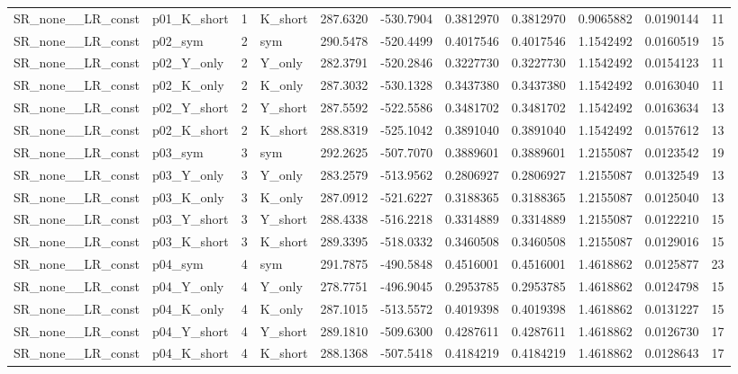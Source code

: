 \begin{table}[!h]
\begin{tabular}[t]{llrlrrrrrrr}
SR\_none\_\_LR\_const & p01\_K\_short & 1 & K\_short & 287.6320 & -530.7904 & 0.3812970 & 0.3812970 & 0.9065882 & 0.0190144 & 11\\
\addlinespace
SR\_none\_\_LR\_const & p02\_sym & 2 & sym & 290.5478 & -520.4499 & 0.4017546 & 0.4017546 & 1.1542492 & 0.0160519 & 15\\
SR\_none\_\_LR\_const & p02\_Y\_only & 2 & Y\_only & 282.3791 & -520.2846 & 0.3227730 & 0.3227730 & 1.1542492 & 0.0154123 & 11\\
SR\_none\_\_LR\_const & p02\_K\_only & 2 & K\_only & 287.3032 & -530.1328 & 0.3437380 & 0.3437380 & 1.1542492 & 0.0163040 & 11\\
SR\_none\_\_LR\_const & p02\_Y\_short & 2 & Y\_short & 287.5592 & -522.5586 & 0.3481702 & 0.3481702 & 1.1542492 & 0.0163634 & 13\\
SR\_none\_\_LR\_const & p02\_K\_short & 2 & K\_short & 288.8319 & -525.1042 & 0.3891040 & 0.3891040 & 1.1542492 & 0.0157612 & 13\\
\addlinespace
SR\_none\_\_LR\_const & p03\_sym & 3 & sym & 292.2625 & -507.7070 & 0.3889601 & 0.3889601 & 1.2155087 & 0.0123542 & 19\\
SR\_none\_\_LR\_const & p03\_Y\_only & 3 & Y\_only & 283.2579 & -513.9562 & 0.2806927 & 0.2806927 & 1.2155087 & 0.0132549 & 13\\
SR\_none\_\_LR\_const & p03\_K\_only & 3 & K\_only & 287.0912 & -521.6227 & 0.3188365 & 0.3188365 & 1.2155087 & 0.0125040 & 13\\
SR\_none\_\_LR\_const & p03\_Y\_short & 3 & Y\_short & 288.4338 & -516.2218 & 0.3314889 & 0.3314889 & 1.2155087 & 0.0122210 & 15\\
SR\_none\_\_LR\_const & p03\_K\_short & 3 & K\_short & 289.3395 & -518.0332 & 0.3460508 & 0.3460508 & 1.2155087 & 0.0129016 & 15\\
\addlinespace
SR\_none\_\_LR\_const & p04\_sym & 4 & sym & 291.7875 & -490.5848 & 0.4516001 & 0.4516001 & 1.4618862 & 0.0125877 & 23\\
SR\_none\_\_LR\_const & p04\_Y\_only & 4 & Y\_only & 278.7751 & -496.9045 & 0.2953785 & 0.2953785 & 1.4618862 & 0.0124798 & 15\\
SR\_none\_\_LR\_const & p04\_K\_only & 4 & K\_only & 287.1015 & -513.5572 & 0.4019398 & 0.4019398 & 1.4618862 & 0.0131227 & 15\\
SR\_none\_\_LR\_const & p04\_Y\_short & 4 & Y\_short & 289.1810 & -509.6300 & 0.4287611 & 0.4287611 & 1.4618862 & 0.0126730 & 17\\
SR\_none\_\_LR\_const & p04\_K\_short & 4 & K\_short & 288.1368 & -507.5418 & 0.4184219 & 0.4184219 & 1.4618862 & 0.0128643 & 17\\

\end{tabular}
\end{table}
